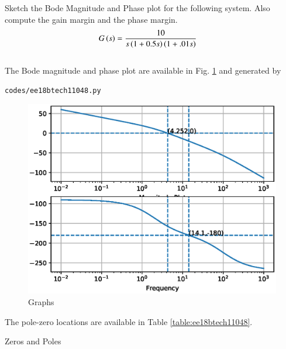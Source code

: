 % 

\item Sketch the Bode Magnitude and Phase plot for the following system. Also compute the gain margin and the phase margin.
\begin{align}
G\left(s\right) &= \frac{10}{s\left(1+0.5s\right)\left(1+.01s\right)}
\label{eq:ee18btech11048_2}
\end{align}
\\
\solution The Bode magnitude and phase plot are available in  Fig. \ref{fig:ee18btech11048} and generated by \begin{lstlisting}
codes/ee18btech11048.py
\end{lstlisting}

\begin{figure}[!h]
\centering
  \includegraphics[width=\columnwidth]{./figs/ee18btech11048.eps}
  \caption{Graphs}
  \label{fig:ee18btech11048}
\end{figure}
The pole-zero locations are available in Table \ref{table:ee18btech11048}.
\begin{table}[!ht]
\centering

\caption{Zeros and Poles}
\label{table:ee18btech11048}
\end{table}



